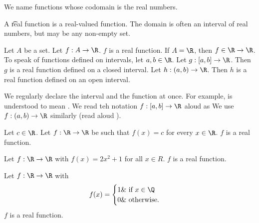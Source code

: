 

We name functions whose codomain is the real numbers.


A \t{real function} is a real-valued function.
The domain is often an interval of real numbers, but may be any non-empty set.


Let $A$ be a set.
Let $f: A \to \R $.
$f$ is a real function.
If $A = \R $, then $f \in \R  \to \R $.
To speak of functions defined on intervals, let $a, b \in \R $.
Let $g: [a, b] \to \R $.
Then $g$ is a real function defined on a closed interval.
Let $h: (a, b) \to \R $.
Then $h$ is a real function defined on an open interval.

We regularly declare the interval and the function at once.
For example,
 is understood to mean .
We read teh notation $f: [a, b] \to \R $ aloud as 
We use $f: (a, b) \to \R $ similarly (read aloud ).


\begin{expl}
Let $c \in \R $.
Let $f: \R  \to \R $ be such that $f(x) = c$ for every $x \in \R $.
$f$ is a real function.
\end{expl}

\begin{expl}
Let $f: \R  \to \R $ with $f(x) = 2x^2 + 1$ for all $x \in R$.
$f$ is a real function.
\end{expl}

\begin{expl}
Let $f: \R  \to \R $ with
  \[
f(x) = \begin{cases}
1 \& \text{ if } x \in \Q  \\
0 \& \text{ otherwise. }
\end{cases}
  \]
$f$ is a real function.
\end{expl}
